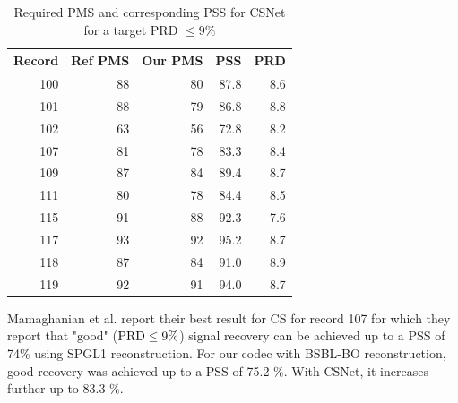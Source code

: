 \begin{table}[ht]
\centering
\caption{Required PMS and corresponding PSS for CSNet for
a target PRD $\leq 9\%$}
\begin{tabular}{rrrrr}
\toprule
 Record &  Ref PMS &  Our PMS &  PSS &  PRD \\
\midrule
    100 &         88 &   80 & 87.8 &  8.6 \\
    101 &         88 &   79 & 86.8 &  8.8 \\
    102 &         63 &   56 & 72.8 &  8.2 \\
    107 &         81 &   78 & 83.3 &  8.4 \\
    109 &         87 &   84 & 89.4 &  8.7 \\
    111 &         80 &   78 & 84.4 &  8.5 \\
    115 &         91 &   88 & 92.3 &  7.6 \\
    117 &         93 &   92 & 95.2 &  8.7 \\
    118 &         87 &   84 & 91.0 &  8.9 \\
    119 &         92 &   91 & 94.0 &  8.7 \\
\bottomrule
\end{tabular}
\label{tbl-csnet-optimal-pss-prd}
\end{table}


Mamaghanian et al. \cite{mamaghanian2011compressed}
report their best result for CS for record 107
for which they report that "good" ($\mathrm{PRD} \leq 9\%$)
signal recovery can be achieved up to a PSS of 74\%
using SPGL1 reconstruction.
For our codec with BSBL-BO reconstruction, good
recovery was achieved up to a PSS of 75.2 \%.
With CSNet, it increases further up to 83.3 \%.
